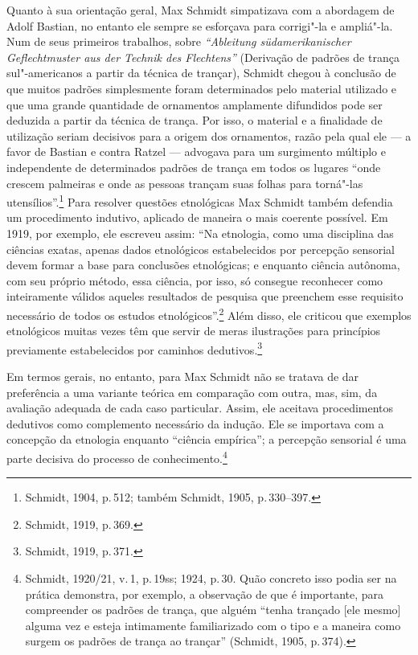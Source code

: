 Quanto à sua orientação geral, Max Schmidt simpatizava com a abordagem
de Adolf Bastian, no entanto ele sempre se esforçava para corrigi"-la e
ampliá"-la. Num de seus primeiros trabalhos, sobre \textit{``Ableitung
südamerikanischer Geflechtmuster aus der Technik des Flechtens''}
(Derivação de padrões de trança sul"-americanos a partir da técnica de
trançar), Schmidt chegou à conclusão de que muitos padrões simplesmente
foram determinados pelo material utilizado e que uma grande quantidade
de ornamentos amplamente difundidos pode ser deduzida a partir da
técnica de trança. Por isso, o material e a finalidade de utilização
seriam decisivos para a origem dos ornamentos, razão pela qual ele --- a
favor de Bastian e contra Ratzel --- advogava para um surgimento múltiplo
e independente de determinados padrões de trança em todos os lugares
``onde crescem palmeiras e onde as pessoas trançam suas folhas para
torná"-las utensílios''.\footnote{Schmidt, 1904, p.\,512; também Schmidt,
  1905, p.\,330--397.} Para resolver questões etnológicas Max Schmidt
também defendia um procedimento indutivo, aplicado de maneira o mais
coerente possível. Em 1919, por exemplo, ele escreveu assim: ``Na
etnologia, como uma disciplina das ciências exatas, apenas dados
etnológicos estabelecidos por percepção sensorial devem formar a base
para conclusões etnológicas; e enquanto ciência autônoma, com seu
próprio método, essa ciência, por isso, só consegue reconhecer como
inteiramente válidos aqueles resultados de pesquisa que preenchem esse
requisito necessário de todos os estudos etnológicos''.\footnote{Schmidt,
  1919, p.\,369.} Além disso, ele criticou que exemplos etnológicos
muitas vezes têm que servir de meras ilustrações para princípios
previamente estabelecidos por caminhos dedutivos.\footnote{Schmidt, 1919, p.\,371.}

Em termos gerais, no entanto, para Max Schmidt não se tratava de dar
preferência a uma variante teórica em comparação com outra, mas, sim,
da avaliação adequada de cada caso particular. Assim, ele aceitava
procedimentos dedutivos como complemento necessário da indução. Ele se
importava com a concepção da etnologia enquanto ``ciência empírica''; a
percepção sensorial é uma parte decisiva do processo de
conhecimento.\footnote{Schmidt, 1920/21, v.\,1, p.\,19ss; 1924, p.\,30.
  Quão concreto isso podia ser na prática demonstra, por exemplo, a
  observação de que é importante, para compreender os padrões de trança,
  que alguém ``tenha trançado {[}ele mesmo{]} alguma vez e esteja
  intimamente familiarizado com o tipo e a maneira como surgem os
  padrões de trança ao trançar'' (Schmidt, 1905, p.\,374).}

